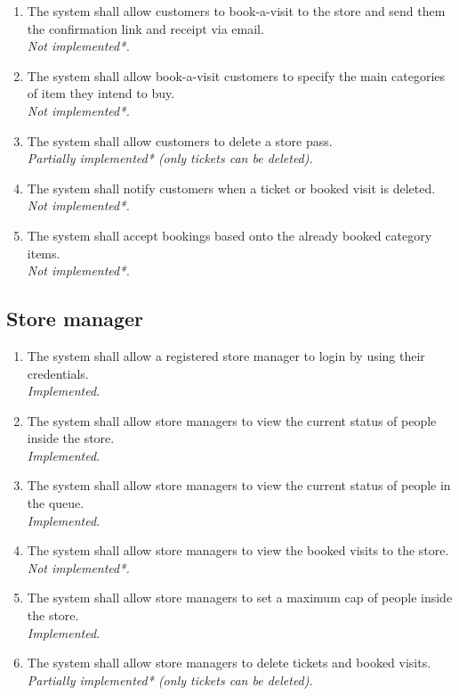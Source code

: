 \begin{enumerate}[series=requirements, label=\textbf{R.\arabic*}]
    \item The system shall allow customers to book-a-visit to the store and send them the confirmation link and receipt via email.\\[4pt] \textit{Not implemented*.}
    \item The system shall allow book-a-visit customers to specify the main categories of item they intend to buy.\\[4pt] \textit{Not implemented*.}
    \item The system shall allow customers to delete a store pass.\\[4pt] \textit{Partially implemented* (only tickets can be deleted).}
    \item The system shall notify customers when a ticket or booked visit is deleted.\\[4pt] \textit{Not implemented*.}
    \item The system shall accept bookings based onto the already booked category items.\\[4pt] \textit{Not implemented*.}
\end{enumerate}

\subsection{Store manager}
\begin{enumerate}[resume*=requirements]
    \item The system shall allow a registered store manager to login by using their credentials.\\[4pt] \textit{Implemented.}
    \item The system shall allow store managers to view the current status of people inside the store.\\[4pt] \textit{Implemented.}
    \item The system shall allow store managers to view the current status of people in the queue.\\[4pt] \textit{Implemented.}
    \item The system shall allow store managers to view the booked visits to the store.\\[4pt] \textit{Not implemented*.}
    \item The system shall allow store managers to set a maximum cap of people inside the store.\\[4pt] \textit{Implemented.}
    \item The system shall allow store managers to delete tickets and booked visits.\\[4pt] \textit{Partially implemented* (only tickets can be deleted).}
\end{enumerate}

